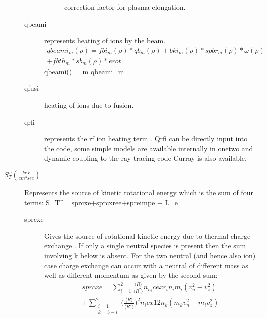 \begin{description}
\begin{description}
\begin{description}
   correction factor for plasma elongation.
  \end{description}
  \item[qbeami] represents heating of ions by the beam.
  \begin{multline}
   qbeami_m(\rho)=fbi_m(\rho)*qb_m(\rho)+bki_m(\rho)*
   spbr_m(\rho)*\omega(\rho)\\
   +fbth_m*sb_m(\rho)*erot \label{eq:qbeamim}
  \end{multline}  
  \beq
   qbeami(\rho)=\sum_m qbeami_m
  \eeq  
  \item[qfusi]  heating of ions due to fusion.
  \item[qrfi] represents the rf ion heating term . Qrfi can be  directly input
  into the code, some simple models are available internally in onetwo and
  dynamic coupling to the  ray tracing code Curray is also available.
 \end{description}   %
 \item [$S_T^\omega (\frac{keV}{cm^3sec})$] Represents the source  of kinetic
 rotational energy which is the sum of four terms:
 \beq
  S_T^\omega = sprcxe+sprcxree+spreimpe + \omega L_e
 \eeq
 \begin{description}  %
  \item[sprcxe] Gives the  source of rotational kinetic energy due to thermal
  charge exchange . If only a single neutral species is present then the sum
  involving k below is absent. For the two neutral (and hence also ion) case
  charge exchange can  occur with a neutral of different mass as well as
  different momentum as given by the second sum:
  \begin{multline}
   sprcxe=\sum_{i=1}^{2} \frac{\langle R\rangle}{\langle R^2\rangle} 
    n_{n_i}cexr_in_im_i(v_n^2-v_z^2)\\
   +\sum_{\substack{i=1 \\ k = 3-i}}^{2}
   \bigg(\frac{\langle R\rangle}{\langle R^2\rangle}\bigg)^2 
    n_i cx12 n_k (m_kv_n^2-m_iv_z^2)
  \end{multline}

\end{description}
\end{description}
